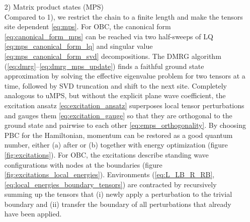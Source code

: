 \begin{enumerate}
	\item[2)] Matrix product states (MPS) \\[0.3em]
	Compared to 1), we restrict the chain to a finite length and make the tensors site dependent \eqref{eq:mps}. For OBC, the canonical form \eqref{eq:canonical_form_mps} can be reached via two half-sweeps of LQ \eqref{eq:mps_canonical_form_lq} and singular value \eqref{eq:mps_canonical_form_svd} decompositions. The DMRG algorithm (\ref{eq:dmrg}--\ref{eq:dmrg_mps_update}) finds a faithful ground state approximation by solving the effective eigenvalue problem for two tensors at a time, followed by SVD truncation and shift to the next site. Completely analogous to uMPS, but without the explicit plane wave coefficient, the excitation ansatz \eqref{eq:excitation_ansatz} superposes local tensor perturbations and gauges them \eqref{eq:excitation_gauge} so that they are orthogonal to the ground state and pairwise to each other \eqref{eq:emps_orthogonality}. By choosing PBC for the Hamiltonian, momentum can be restored as a good quantum number, either (a) after or (b) together with energy optimization (figure \ref{fig:excitations}). For OBC, the excitations describe standing wave configurations with nodes at the boundaries (figure \ref{fig:excitations_local_energies}). Environments (\ref{eq:L_LB_R_RB}, \ref{eq:local_energies_boundary_tensors}) are contracted by recursively summing up the tensors that (i) newly apply a perturbation to the trivial boundary and (ii) transfer the boundary of all perturbations that already have been applied.
	 

\end{enumerate}
